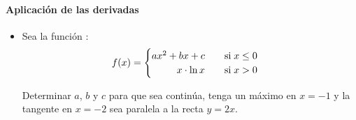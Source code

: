 \documentclass[11pt, twocolumn, landscape, a4paper]{article}
\begin{document}
\paragraph*{Aplicación de las derivadas}

\begin{itemize}
\item{Sea la función :
$$
f(x) = \begin{cases}
ax^2 + bx + c \qquad  \text{si}\;x \leq 0 \\
\hfill x \cdot \ln x \qquad  \text{si}\;x > 0
\end{cases}
$$

Determinar $a$, $b$ y $c$ para que sea continúa, tenga un máximo en $x = -1$ y la tangente en $x = -2$ sea paralela a la recta $y = 2x$.
}
\end{itemize}
\end{document}
